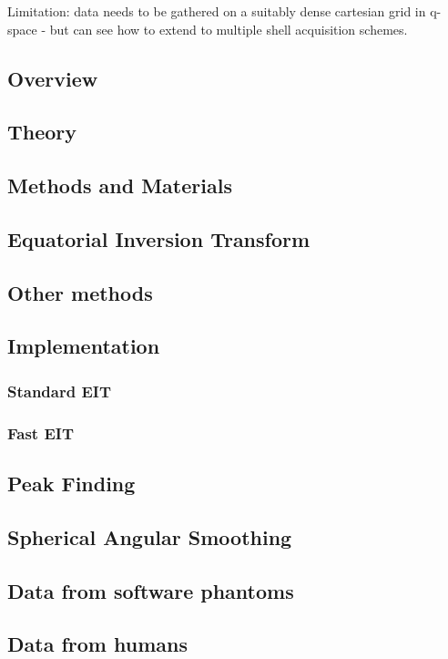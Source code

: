 \documentclass{bioinfo}
\begin{document}
Limitation: data needs to be gathered on a suitably dense cartesian grid
in q-space - but can see how to extend to multiple shell acquisition
schemes.


\subsection{Overview}

\subsection{Theory}

\begin{methods}

\section{Methods and Materials}

\subsection{Equatorial Inversion Transform}

\subsection{Other methods}

\subsection{Implementation }

\subsubsection{Standard EIT\label{sub:Standard-EIT}}

\subsubsection{Fast EIT}

\subsection{Peak Finding\label{sub:Peak-Finding}}

\subsection{Spherical Angular Smoothing\label{sub:Spherical-Angular-Smoothing}}

\subsection{Data from software phantoms}

\subsection{Data from humans}

\end{methods}
\end{document}
